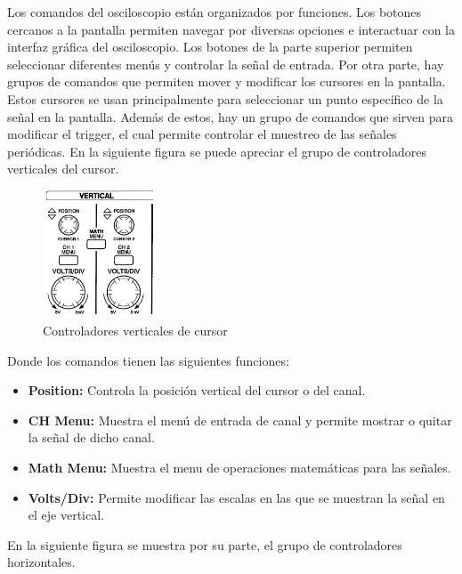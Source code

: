 \documentclass[12pt]{article}
\begin{document}
Los comandos del osciloscopio están organizados por funciones. Los botones cercanos a la pantalla permiten navegar por diversas opciones e interactuar con la interfaz gráfica del osciloscopio. Los botones de la parte superior permiten seleccionar diferentes menús y controlar la señal de entrada. Por otra parte, hay grupos de comandos que permiten mover y modificar los cursores en la pantalla. Estos cursores se usan principalmente para seleccionar un punto específico de la señal en la pantalla. Además de estos, hay un grupo de comandos que sirven para modificar el trigger, el cual permite controlar el muestreo de las señales periódicas. En la siguiente figura se puede apreciar el grupo de controladores verticales del cursor.\\

\begin{figure}[h!]
	\centering
	\includegraphics[width=0.3\textwidth,height=0.25\textheight]{Osci-vertical}
	\caption{Controladores verticales de cursor}
\end{figure}

Donde los comandos tienen las siguientes funciones:
\begin{itemize}
	\item \textbf{Position:} Controla la posición vertical del cursor o del canal. 
	\item \textbf{CH Menu:} Muestra el menú de entrada de canal y permite mostrar o quitar la señal de dicho canal.
	\item \textbf{Math Menu:} Muestra el menu de operaciones matemáticas para las señales.
	\item \textbf{Volts/Div:} Permite modificar las escalas en las que se muestran la señal en el eje vertical.

\end{itemize}

En la siguiente figura se muestra por su parte, el grupo de controladores horizontales.
\end{document}
